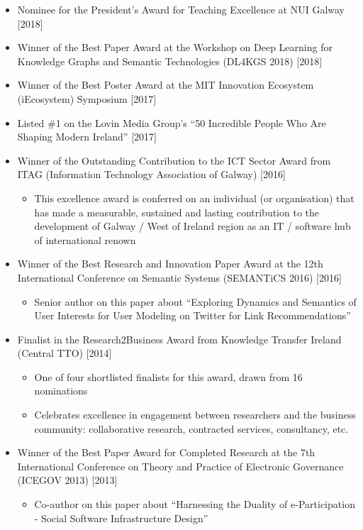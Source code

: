 \documentclass[10pt,a4paper]{res} %
\begin{document}
\begin{resume}
\begin{itemize} \itemsep -2pt
\item Nominee for the President's Award for Teaching Excellence at NUI Galway [2018]
\item Winner of the Best Paper Award at the Workshop on Deep Learning for Knowledge Graphs and Semantic Technologies (DL4KGS 2018) [2018]
\item Winner of the Best Poster Award at the MIT Innovation Ecosystem (iEcosystem) Symposium [2017]
\item Listed \#1 on the Lovin Media Group's ``50 Incredible People Who Are Shaping Modern Ireland'' [2017]
\item Winner of the Outstanding Contribution to the ICT Sector Award from ITAG (Information Technology Association of Galway) [2016]
\begin{itemize} \itemsep -2pt
\item This excellence award is conferred on an individual (or organisation) that has made a measurable, sustained and lasting contribution to the development of Galway / West of Ireland region as an IT / software hub of international renown
\end{itemize}
\item Winner of the Best Research and Innovation Paper Award at the 12th International Conference on Semantic Systems (SEMANTiCS 2016) [2016]
\begin{itemize} \itemsep -2pt
\item Senior author on this paper about ``Exploring Dynamics and Semantics of User Interests for User Modeling on Twitter for Link Recommendations''
\end{itemize}
\item Finalist in the Research2Business Award from Knowledge Transfer Ireland (Central TTO) [2014]
\begin{itemize} \itemsep -2pt
\item One of four shortlisted finalists for this award, drawn from 16 nominations
\item Celebrates excellence in engagement between researchers and the business community: collaborative research, contracted services, consultancy, etc.
\end{itemize}
\item Winner of the Best Paper Award for Completed Research at the 7th International Conference on Theory and Practice of Electronic Governance (ICEGOV 2013) [2013]
\begin{itemize} \itemsep -2pt
\item Co-author on this paper about ``Harnessing the Duality of e-Participation - Social Software Infrastructure Design''

\end{itemize}
\end{itemize}
\end{resume}
\end{document}
